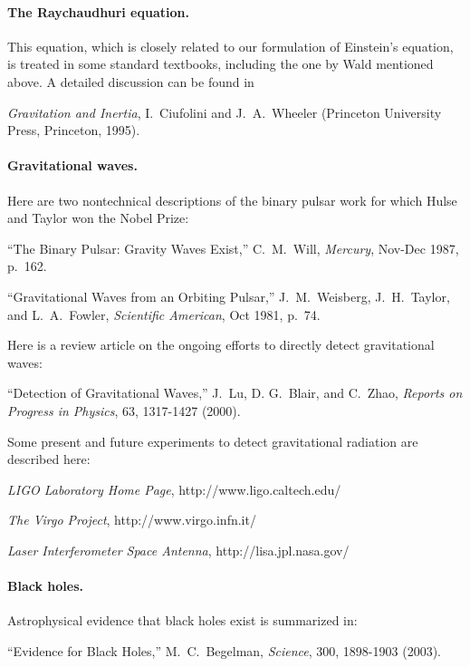 \paragraph{The Raychaudhuri equation.}  This equation, which
is closely related to our formulation of Einstein's equation,
is treated in some standard textbooks, including the one by Wald mentioned
above.  A detailed discussion can be found in

\medskip\noindent
{\it Gravitation and Inertia}, I.\ Ciufolini and J.\ A.\ Wheeler (Princeton
University Press, Princeton, 1995).

\paragraph{Gravitational waves.}  

Here are two nontechnical descriptions of the binary pulsar work
for which Hulse and Taylor won the Nobel Prize:

\medskip\noindent ``The Binary Pulsar: Gravity Waves Exist,''
C.\ M.\ Will, {\it Mercury}, Nov-Dec 1987, p.\ 162.

\medskip\noindent
``Gravitational Waves from an Orbiting Pulsar,'' J.\ M.\ Weisberg, 
J.\ H.\ Taylor, and L.\ A.\ Fowler, 
{\it Scientific American}, Oct 1981, p.\ 74.

\medskip
\noindent
Here is a review article on the ongoing efforts to directly detect
gravitational waves:

\medskip
\noindent
``Detection of Gravitational Waves,'' J.\ Lu, D. G.\ Blair, and C.\ 
Zhao, {\it Reports on Progress in Physics}, 63, 1317-1427 (2000).

\medskip
\noindent
Some present and future experiments to detect gravitational radiation are
described here:

\medskip
\noindent
{\it LIGO Laboratory Home Page},
http://www.ligo.caltech.edu/

\medskip
\noindent
{\it The Virgo Project},
http://www.virgo.infn.it/

\medskip
\noindent
{\it Laser Interferometer Space Antenna}, http://lisa.jpl.nasa.gov/




\paragraph{Black holes.}
Astrophysical evidence that black holes exist is summarized in:

\medskip
\noindent
``Evidence for Black Holes,'' M.\ C.\ Begelman, {\it Science}, 300, 1898-1903
(2003).

